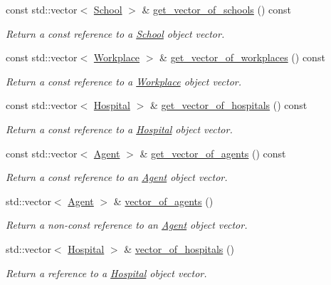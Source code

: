 \begin{DoxyCompactItemize}
const std\+::vector$<$ \hyperlink{classSchool}{School} $>$ \& \hyperlink{classABM_a6b2883283dd859e05b9c00c5939076a1}{get\+\_\+vector\+\_\+of\+\_\+schools} () const
\begin{DoxyCompactList}\small\item\em Return a const reference to a \hyperlink{classSchool}{School} object vector. \end{DoxyCompactList}\item 
const std\+::vector$<$ \hyperlink{classWorkplace}{Workplace} $>$ \& \hyperlink{classABM_a04c29c9054c1c1dfbfb45f0af85a5a7f}{get\+\_\+vector\+\_\+of\+\_\+workplaces} () const
\begin{DoxyCompactList}\small\item\em Return a const reference to a \hyperlink{classWorkplace}{Workplace} object vector. \end{DoxyCompactList}\item 
const std\+::vector$<$ \hyperlink{classHospital}{Hospital} $>$ \& \hyperlink{classABM_a16e9e7297235fa57b1b65b9340af49ad}{get\+\_\+vector\+\_\+of\+\_\+hospitals} () const
\begin{DoxyCompactList}\small\item\em Return a const reference to a \hyperlink{classHospital}{Hospital} object vector. \end{DoxyCompactList}\item 
const std\+::vector$<$ \hyperlink{classAgent}{Agent} $>$ \& \hyperlink{classABM_a57429e18dccc3f7060dd6212125c97ee}{get\+\_\+vector\+\_\+of\+\_\+agents} () const
\begin{DoxyCompactList}\small\item\em Return a const reference to an \hyperlink{classAgent}{Agent} object vector. \end{DoxyCompactList}\item 
std\+::vector$<$ \hyperlink{classAgent}{Agent} $>$ \& \hyperlink{classABM_a58d45195b1ab07fadd7f4a23adc8b18a}{vector\+\_\+of\+\_\+agents} ()
\begin{DoxyCompactList}\small\item\em Return a non-\/const reference to an \hyperlink{classAgent}{Agent} object vector. \end{DoxyCompactList}\item 
std\+::vector$<$ \hyperlink{classHospital}{Hospital} $>$ \& \hyperlink{classABM_ad51360c08ebbbc18a574078901f6c82a}{vector\+\_\+of\+\_\+hospitals} ()
\begin{DoxyCompactList}\small\item\em Return a reference to a \hyperlink{classHospital}{Hospital} object vector. \end{DoxyCompactList}\item 

\end{DoxyCompactItemize}
